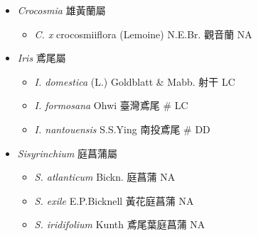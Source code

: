 
  \begin{itemize}
 \item[] \textit{Crocosmia} 雄黃蘭屬
                                
  \begin{itemize}
        \item[] \textit{C. x} crocosmiiflora (Lemoine) N.E.Br.  觀音蘭   NA
  \end{itemize}
 \item[] \textit{Iris} 鳶尾屬
                                
  \begin{itemize}
        \item[] \textit{I. domestica} (L.) Goldblatt \& Mabb.  射干   LC
        \item[] \textit{I. formosana} Ohwi  臺灣鳶尾  \# LC
        \item[] \textit{I. nantouensis} S.S.Ying  南投鳶尾  \# DD
  \end{itemize}
 \item[] \textit{Sisyrinchium} 庭菖蒲屬
                                
  \begin{itemize}
        \item[] \textit{S. atlanticum} Bickn.  庭菖蒲   NA
        \item[] \textit{S. exile} E.P.Bicknell  黃花庭菖蒲   NA
        \item[] \textit{S. iridifolium} Kunth  鳶尾葉庭菖蒲   NA
  \end{itemize}
  \end{itemize}
